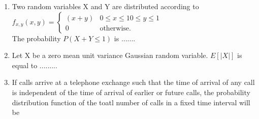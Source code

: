 \documentclass[journal,12pt,twocolumn]{IEEEtran}
\begin{document}
\begin{enumerate}
\item Two random variables X and Y are distributed according to\\
{\centering $
f_{x,y}(x,y) = 
\begin{cases}
 (x+y) & 0 \leqslant x \leqslant 1   0 \leqslant y \leqslant 1 \\
 0 & \text{otherwise}.
 \end{cases}
 $ \\}
The probability $P(X+Y \leqslant 1)$ is .......


\item Let X be a zero mean unit variance Gaussian random variable. $E[|X|]$ is equal to .........

\item If calls arrive at a telephone exchange such that the time of arrival of any call is independent of the time of arrival of earlier or future calls, the probability distribution function of the toatl number of calls in a fixed time interval will be

\begin{enumerate}
\end{enumerate}
\end{enumerate}
\end{document}
